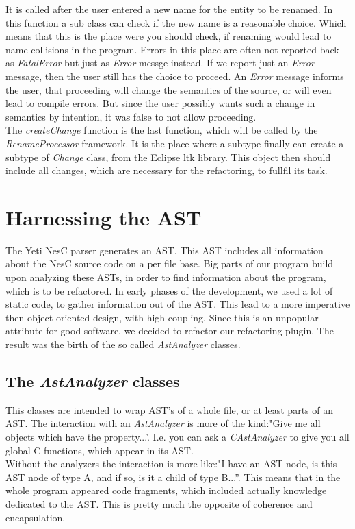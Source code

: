 \documentclass[a4paper,10pt]{report}
\begin{document}
It is called after the user entered a new name for the entity to be renamed.
In this function a sub class can check if the new name is a reasonable choice.
Which means that this is the place were you should check, if renaming would lead to name collisions in the program.
Errors in this place are often not reported back as {\it FatalError} but just as {\it Error} messge instead.
If we report just an {\it Error} message, then the user still has the choice to  proceed. An {\it Error} message informs the user, that proceeding
will change the semantics of the source, or will even lead to compile errors. But since the user possibly wants such a change in semantics by intention, it was false to not allow proceeding.\\
The {\it createChange} function is the last function, which will be called by the {\it RenameProcessor} framework. It is the place where a subtype finally can create a subtype of {\it Change} class, from the Eclipse ltk library.
This object then should include all changes, which are necessary for the refactoring, to fullfil its task.

\chapter{Harnessing the AST}
\label{harnessingTheAST}
The Yeti NesC parser generates an AST. This AST includes all information about the NesC source code on a per file base. Big parts of our program build upon analyzing these ASTs, in order to find information about the program, which is to be refactored.
In early phases of the development, we used a lot of static code, to gather information out of the AST. This lead to a more imperative then object oriented design, with high coupling. Since this is an unpopular attribute for good software, we decided to refactor our refactoring plugin. 
The result was the birth of the so called {\it AstAnalyzer} classes.

\section{The {\it AstAnalyzer} classes}
This classes are intended to wrap AST's of a whole file, or at least parts of an AST. The interaction with an {\it AstAnalyzer} is more of the kind:"Give me all objects which have the property...'. I.e. you can ask a {\it CAstAnalyzer} to give you all global C functions, which appear in its AST.\\
Without the analyzers the interaction is more like:"I have an AST node, is this AST node of type A, and if so, is it a child of type B...''. This means that in the whole program appeared code fragments, which included actually knowledge dedicated to the AST. This is pretty much the opposite of coherence and encapsulation.
\end{document}
